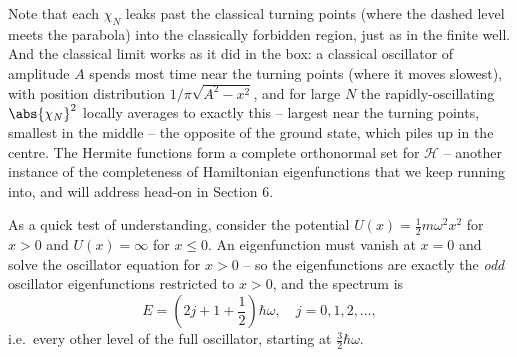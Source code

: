 \begin{center}
\end{center}

Note that each $\chi_N$ leaks past the classical turning points (where the dashed level meets the parabola) into the classically forbidden region, just as in the finite well. And the classical limit works as it did in the box: a classical oscillator of amplitude $A$ spends most time near the turning points (where it moves slowest), with position distribution $1/\pi\sqrt{A^2 - x^2}$, and for large $N$ the rapidly-oscillating $\abs{\chi_N}^2$ locally averages to exactly this -- largest near the turning points, smallest in the middle -- the opposite of the ground state, which piles up in the centre. The Hermite functions form a complete orthonormal set for $\mathcal{H}$ -- another instance of the completeness of Hamiltonian eigenfunctions that we keep running into, and will address head-on in Section 6.

\begin{example}
    As a quick test of understanding, consider the potential $U(x) = \frac{1}{2}m\omega^2 x^2$ for $x > 0$ and $U(x) = \infty$ for $x \leq 0$. An eigenfunction must vanish at $x = 0$ and solve the oscillator equation for $x > 0$ -- so the eigenfunctions are exactly the \emph{odd} oscillator eigenfunctions restricted to $x > 0$, and the spectrum is
    $$
    E = \left(2j + 1 + \frac{1}{2}\right) \hbar\omega, \quad j = 0, 1, 2, \dots,
    $$
    i.e.\ every other level of the full oscillator, starting at $\frac{3}{2}\hbar\omega$.
\end{example}

